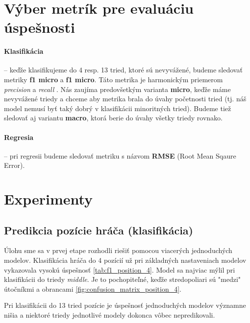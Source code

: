 \documentclass[runningheads]{llncs}
\begin{document}
\section{Výber metrík pre evaluáciu úspešnosti}

\paragraph{Klasifikácia} -- keďže klasifikujeme do 4 resp. 13 tried, ktoré sú nevyvážené, budeme sledovať metriky \textbf{f1 micro} a \textbf{f1 micro}.
Táto metrika je harmonickým priemerom \textit{precision} a \textit{recall} \cite{opitz2019macro}.
Nás zaujíma predovšetkým varianta \textbf{micro}, keďže máme nevyvážené triedy a chceme aby metrika brala do úvahy početnosti tried (tj. náš model nemusí byť taký dobrý v klasifikácii minoritných tried). Budeme tiež sledovať aj variantu \textbf{macro}, ktorá berie do úvahy všetky triedy rovnako.

\paragraph{Regresia} -- pri regresii budeme sledovať metriku s názvom \textbf{RMSE} (Root Mean Sqaure Error).

\section{Experimenty}

\subsection{Predikcia pozície hráča (klasifikácia)}

Úlohu sme sa v prvej etape rozhodli riešiť pomocou viacerých jednoduchých modelov. Klasifikácia hráča do 4 pozícií už pri základných nastaveniach modelov vykazovala vysokú úspešnosť \ref{tab:f1_position_4}. Model sa najviac mýlil pri klasifikácii do triedy \textit{middle}. Je to pochopiteľné, keďže stredopoliari sú "medzi" útočníkmi a obrancami \ref{fig:confusion_matrix_position_4}. 

Pri klasifikácii do 13 tried pozície je úspešnosť jednoduchých modelov významne nišia a niektoré triedy jednotlivé modely dokonca vôbec nepredikovali.
\end{document}
